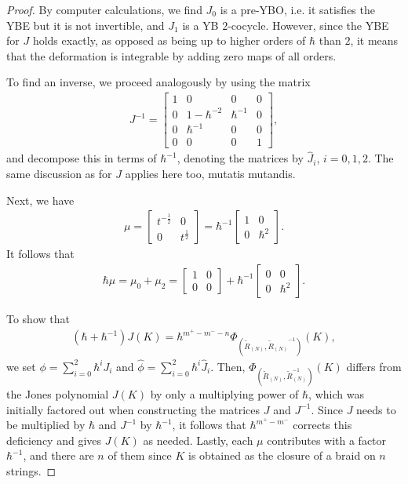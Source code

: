 \documentclass[11pt,fleqn]{amsart} %
\begin{document}
\begin{proof}
 By  computer calculations, we find 
$J_0$ 	is a pre-YBO, i.e. it satisfies the YBE but it is 
  not invertible, 
and $J_1$ is a YB $2$-cocycle.
However, since the YBE for $J$ holds exactly, as opposed as being up to higher orders of $\hbar$ than $2$, it means that the deformation is integrable by adding zero maps of all orders. 
	
	To find an inverse, we proceed analogously by using the matrix
	\begin{eqnarray*}
			J^{-1} = \begin{bmatrix}
				1 & 0 & 0 & 0\\
				0 & 1-\hbar^{-2} & \hbar^{-1} & 0\\
				0 & \hbar^{-1} & 0 & 0\\
				0 & 0 & 0 & 1
			\end{bmatrix},
	\end{eqnarray*}
	and decompose this in terms of $\hbar^{-1}$, denoting the matrices by $\hat J_i$, $i=0,1,2$. The same discussion as for $J$ applies here too, mutatis mutandis. 
	


	Next, we have
	\begin{eqnarray*}
			\mu = \begin{bmatrix}
				t^{-\frac{1}{2}} & 0\\
				0 & t^{\frac{1}{2}}
			\end{bmatrix}
					= \hbar^{-1} \begin{bmatrix}
						1 & 0\\
						0 & \hbar^2
					\end{bmatrix}.
	\end{eqnarray*}
	It follows that 
	\begin{eqnarray*}
			\hbar \mu = \mu_0 + \mu_2 = 
			\begin{bmatrix}
			1 & 0\\
			0 & 0
			\end{bmatrix}
			+ 
			\hbar^{-1} \begin{bmatrix}
			0 & 0\\
			0 & \hbar^2
			\end{bmatrix}.
	\end{eqnarray*}
	
	To show that 
	\begin{eqnarray*}
		(\hbar+\hbar^{-1})J( K) = \hbar^{m^+-m^--n} \Phi_{(\tilde R_{(N)}, {\tilde R_{(N)}}^{-1} )}(  K),
	\end{eqnarray*}
	we set $\phi = \sum_{i=0}^2 \hbar^i J_i$ and $\hat \phi = \sum_{i=0}^2 \hbar^i \hat J_i$. Then, 
	$\Phi_{(\tilde R_{(N)}, \tilde R_{(N)}^{-1} ) } (  K)$ differs from the Jones polynomial $J(  K)$ by only a multiplying power of $\hbar$, which was initially factored out when constructing the matrices $J$ and $J^{-1}$. Since $J$ needs to be multiplied by $\hbar$ and $J^{-1}$ by $\hbar^{-1}$, it follows that $\hbar^{m^+-m^-}$ corrects this deficiency and gives $J( K)$ as needed. Lastly, each $\mu$ contributes with a factor $\hbar^{-1}$, and there are $n$ of them since $K$ is obtained as the closure of a braid on $n$ strings.  
\end{proof}
\end{document}
